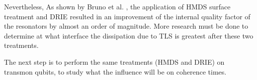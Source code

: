 Nevertheless, As shown by Bruno et al. \cite{bruno2015reducing}, the application of HMDS surface treatment and DRIE resulted in an improvement of the internal quality factor of the resonators by almost an order of magnitude. More research must be done to determine at what interface the dissipation due to TLS is greatest after these two treatments.

The next step is to perform the same treatments (HMDS and DRIE) on transmon qubits, to study what the influence will be on coherence times.
